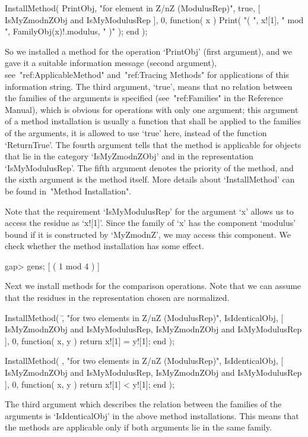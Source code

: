 \begintt
InstallMethod( PrintObj,
"for element in Z/nZ (ModulusRep)",
true,
[ IsMyZmodnZObj and IsMyModulusRep ], 0,
function( x )
Print( "( ", x![1], " mod ", FamilyObj(x)!.modulus, " )" );
end );
\endtt

So we installed a method for the operation `PrintObj' (first argument),
and we gave it a suitable information message (second argument),
see~"ref:ApplicableMethod" and~"ref:Tracing Methods" for applications of
this information string.
The third argument, `true', means that no relation between the families
of the arguments is specified (see~"ref:Families" in the Reference Manual),
which is obvious for operations with only one argument;
this argument of a method installation is usually a function that shall
be applied to the families of the arguments,
it is allowed to use `true' here, instead of the function `ReturnTrue'.
The fourth argument tells {\GAP} that the method is applicable for
objects that lie in the category `IsMyZmodnZObj' and in the representation
`IsMyModulusRep'.
The fifth argument denotes the priority of the method,
and the sixth argument is the method itself.
More details about `InstallMethod' can be found in~"Method Installation".

Note that the requirement `IsMyModulusRep' for the argument `x' allows us
to access the residue as `x![1]'.
Since the family of `x' has the component `modulus' bound if it is
constructed by `MyZmodnZ', we may access this component.
We check whether the method installation has some effect.

\begintt
gap> gens;
[ ( 1 mod 4 ) ]
\endtt

Next we install methods for the comparison operations.
Note that we can assume that the residues in the representation chosen
are normalized.

\begintt
InstallMethod( \=,
    "for two elements in Z/nZ (ModulusRep)",
    IsIdenticalObj,
    [ IsMyZmodnZObj and IsMyModulusRep, IsMyZmodnZObj and IsMyModulusRep ],
    0,
    function( x, y ) return x![1] = y![1]; end );

InstallMethod( \<,
    "for two elements in Z/nZ (ModulusRep)",
    IsIdenticalObj,
    [ IsMyZmodnZObj and IsMyModulusRep, IsMyZmodnZObj and IsMyModulusRep ],
    0,
    function( x, y ) return x![1] < y![1]; end );
\endtt

The third argument which describes the relation between the families of
the arguments is `IsIdenticalObj' in the above method installations.
This means that the methods are applicable only if both arguments lie in
the same family.

